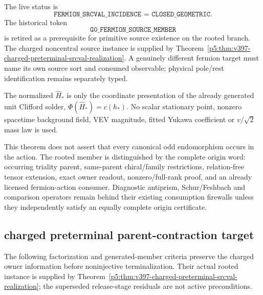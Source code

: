 \documentclass[12pt,a4paper]{article}
\begin{document}
\begin{corollary}
\label{p5:cor:v392-primitive-source-boundary-retired}
The live status is
\[
 \boxed{\texttt{FERMION\_SRCVAL\_INCIDENCE = CLOSED\_GEOMETRIC}.}
\]
The historical token
\[
 \texttt{G0\_FERMION\_SOURCE\_MEMBER}
\]
is retired as a prerequisite for primitive source existence on the rooted
branch.  The charged noncentral source instance is supplied by
Theorem~\ref{p5:thm:v397-charged-preterminal-srcval-realization}.
A genuinely different fermion target must name its own source sort and
consumed observable; physical pole/rest identification remains separately typed.
\end{corollary}

\begin{remark}
\label{p5:rem:v392-no-vev-source-origin}
The normalized $\widehat H_*$ is only the coordinate presentation of the
already generated unit Clifford solder, $\Phi(\widehat H_*)=c(h_*)$.  No scalar
stationary point, nonzero spacetime background field, VEV magnitude, fitted
Yukawa coefficient or $v/\sqrt2$ mass law is used.
\end{remark}

\begin{remark}[No overgeneration]
\label{p5:rem:v392-no-canonical-operator-overgeneration}
This theorem does not assert that every canonical odd endomorphism occurs in
the action.  The rooted member is distinguished by the complete origin word:
occurring triality parent, same-parent chiral/family restrictions,
relation-free tensor extension, exact owner readout, nonzero/full-rank proof,
and an already licensed fermion-action consumer.  Diagnostic antiprism,
Schur/Feshbach and comparison operators remain behind their existing
consumption firewalls unless they independently satisfy an equally complete
origin certificate.
\end{remark}

\subsection{charged preterminal parent-contraction target}
\label{p5:sec:v395-preterminal-parent-contraction}
The following factorization and generated-member criteria preserve the
charged owner information before noninjective terminalization.
Their actual rooted instance is supplied by
Theorem~\ref{p5:thm:v397-charged-preterminal-srcval-realization}; the
superseded release-stage residuals are not active preconditions.
\end{document}
